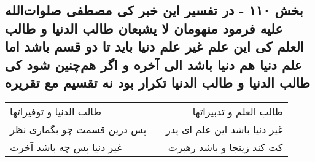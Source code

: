 \begin{center}
\section*{بخش ۱۱۰ - در تفسیر این خبر کی مصطفی صلوات‌الله علیه فرمود منهومان لا  یشبعان طالب الدنیا و طالب العلم کی این علم غیر علم دنیا باید تا دو قسم باشد اما علم دنیا هم دنیا باشد الی آخره و اگر هم‌چنین شود کی طالب الدنیا و طالب الدنیا تکرار بود نه تقسیم  مع تقریره}
\label{sec:sh110}
\begin{longtable}{l p{0.5cm} r}
طالب الدنیا و توفیراتها
&&
طالب العلم و تدبیراتها
\\
پس درین قسمت چو بگماری نظر
&&
غیر دنیا باشد این علم ای پدر
\\
غیر دنیا پس چه باشد آخرت
&&
کت کند زینجا و باشد رهبرت
\\
\end{longtable}
\end{center}
